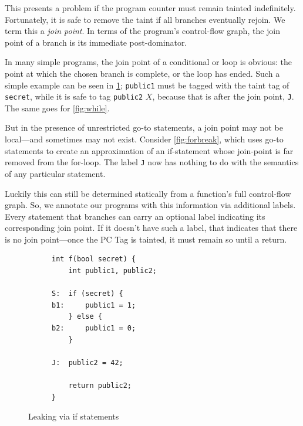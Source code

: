 \documentclass{article}
\begin{document}
This presents a problem if the program counter must remain tainted indefinitely.
Fortunately, it is safe to remove the taint if all branches eventually rejoin.
We term this a {\it join point}. In terms of the program's control-flow graph, the
join point of a branch is its immediate post-dominator.

In many simple programs, the join point of a conditional or loop is obvious:
the point at which the chosen branch is complete, or the loop has ended.
Such a simple example can be seen in \cref{fig:ifthenelse}; {\tt public1} must be
tagged with the taint tag of {\tt secret}, while it is safe to tag {\tt public2}
\(X\), because that is after the join point, {\tt J}. The same goes for \cref{fig:while}.

But in the presence of unrestricted go-to statements, a join point may not be
local---and sometimes may not exist. Consider \cref{fig:forbreak}, which
uses go-to statements to create an approximation of an if-statement whose join-point
is far removed from the for-loop. The label {\tt J} now has nothing to do with the
semantics of any particular statement.

Luckily this can still be determined statically
from a function's full control-flow graph. So, we annotate our programs with this
information via additional labels. Every statement that branches can carry an
optional label indicating its corresponding join point. If it doesn't have such
a label, that indicates that there is no join point---once the PC Tag is tainted,
it must remain so until a return.

\begin{figure}
  \begin{subfigure}{0.5\textwidth}
\begin{verbatim}
int f(bool secret) {
    int public1, public2;

S:  if (secret) {
b1:     public1 = 1;
    } else {
b2:     public1 = 0;
    }

J:  public2 = 42;

    return public2;
}
\end{verbatim}
  \end{subfigure}
  \begin{subfigure}{0.5\textwidth}
  \end{subfigure}
  
  \caption{Leaking via if statements}
  \label{fig:ifthenelse}
\end{figure}
\end{document}
